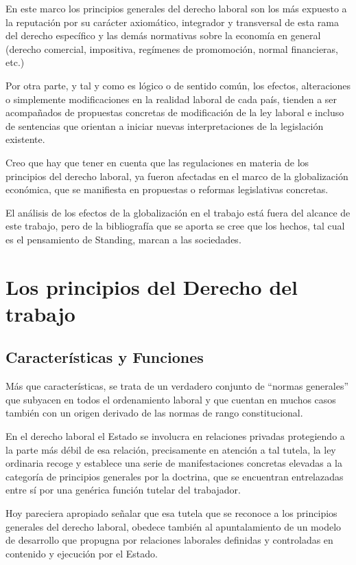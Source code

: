 \documentclass[a4paper]{article}
\begin{document}
En este marco los principios generales del derecho laboral son los más expuesto a la reputación\cite{RAEReputarse} por su carácter axiomático, integrador y transversal de esta rama del derecho específico  y las demás normativas sobre la economía en general (derecho comercial, impositiva, regímenes de promomoción,  normal financieras, etc.)

Por otra parte, y tal y como es lógico o de sentido común, los efectos, alteraciones o simplemente modificaciones en la realidad laboral de cada país, tienden a ser acompañados de propuestas concretas de modificación de la ley laboral e incluso de sentencias que orientan a iniciar nuevas interpretaciones de la legislación existente. 

Creo que hay que tener en cuenta que las regulaciones en materia de los principios del derecho laboral, ya fueron afectadas en el marco de la globalización económica, que se manifiesta en propuestas o reformas legislativas concretas. 

El análisis de los efectos de la globalización en el trabajo está fuera del alcance de este trabajo, pero de la bibliografía que se aporta se cree que los hechos, tal cual es el pensamiento de Standing, marcan a las sociedades. \cite{Standing2010}


\section{Los principios del Derecho del trabajo}
\label{sec:principios}

\subsection{Características y Funciones}
Más que características, se trata de un verdadero conjunto de “normas generales” que subyacen en todos el ordenamiento laboral y que cuentan en muchos casos también con un origen derivado de las normas de rango constitucional. 

En el derecho laboral el Estado se involucra en relaciones privadas protegiendo a la parte más débil de esa relación, precisamente en atención a tal tutela, la ley ordinaria recoge y establece una serie de manifestaciones concretas elevadas a la categoría de principios generales por la doctrina, que se encuentran entrelazadas entre sí por una genérica función tutelar del trabajador.\cite{Terrasa2017}

Hoy pareciera apropiado señalar que esa tutela que se reconoce a los principios generales del derecho laboral, obedece también al apuntalamiento de un modelo de desarrollo que propugna por relaciones laborales definidas y controladas en contenido y ejecución por el Estado. 
\end{document}
